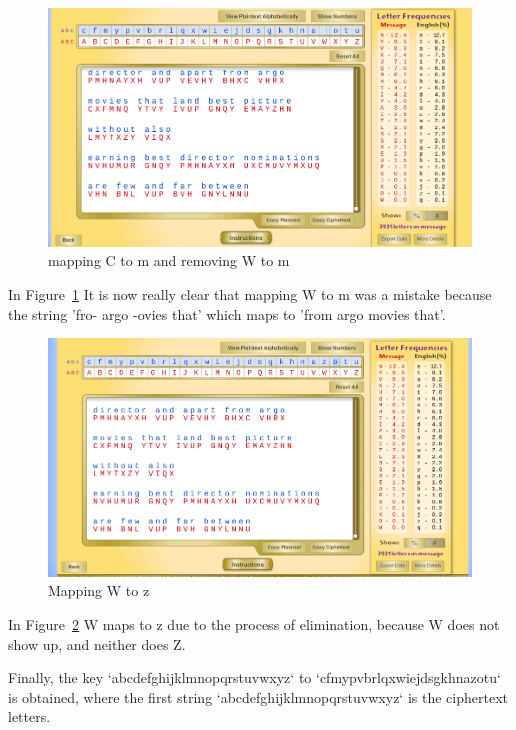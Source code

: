 \documentclass[12pt]{article}
\begin{document}
\begin{figure}[H]
    \begin{center}
        \includegraphics[scale=0.48]{c20.png}
    \end{center}{}
    \caption{mapping C to m and removing W to m}
    \label{fig:c20}
\end{figure}

In Figure~\ref{fig:c20} It is now really clear that mapping W to m was a mistake because the string 'fro- argo -ovies
that' which maps to 'from argo movies that'.

\begin{figure}[!ht]
    \begin{center}
        \includegraphics[scale=0.48]{c21.png}
    \end{center}{}
    \caption{Mapping W to z}
    \label{fig:c21}
\end{figure}

In Figure~\ref{fig:c21} W maps to z due to the process of elimination, because W does not show up, and neither does Z.


Finally, the key `abcdefghijklmnopqrstuvwxyz` to `cfmypvbrlqxwiejdsgkhnazotu` is obtained, where the first string
`abcdefghijklmnopqrstuvwxyz` is the ciphertext letters.
\end{document}
